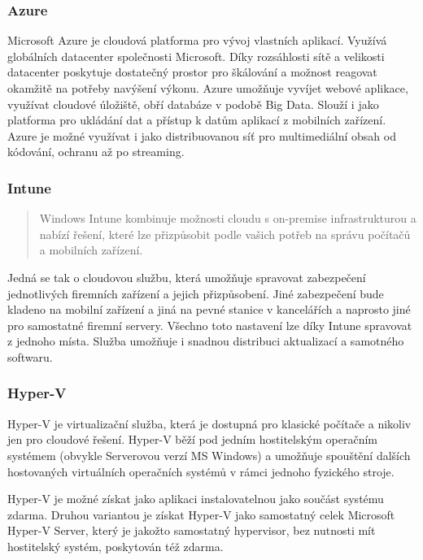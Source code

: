 \subsubsection{Azure}
Microsoft Azure je cloudová platforma pro vývoj vlastních aplikací. Využívá globálních datacenter společnosti Microsoft. Díky rozsáhlosti sítě a velikosti datacenter poskytuje dostatečný prostor pro škálování a možnost reagovat okamžitě na potřeby navýšení výkonu. Azure umožňuje vyvíjet webové aplikace, využívat cloudové úložiště, obří databáze v podobě Big Data. Slouží i jako platforma pro ukládání dat a přístup k datům aplikací z mobilních zařízení. Azure je možné využívat i jako distribuovanou síť pro multimediální obsah od kódování, ochranu až po streaming. \nocite{ms:azure}

\subsubsection{Intune}
\begin{quote}
Windows Intune kombinuje možnosti cloudu s on-premise infrastrukturou a nabízí řešení, které lze přizpůsobit podle vašich potřeb na správu počítačů a mobilních zařízení.\cite{ms:intune}
\end{quote}

Jedná se tak o cloudovou službu, která umožňuje spravovat zabezpečení jednotlivých firemních zařízení a jejich přizpůsobení. Jiné zabezpečení bude kladeno na mobilní zařízení a jiná na pevné stanice v kancelářích a naprosto jiné pro samostatné firemní servery. Všechno toto nastavení lze díky Intune spravovat z jednoho místa. Služba umožňuje i snadnou distribuci aktualizací a samotného softwaru.

\subsubsection{Hyper-V}
Hyper-V je virtualizační služba, která je dostupná pro klasické počítače a nikoliv jen pro cloudové řešení. Hyper-V běží pod jedním hostitelským operačním systémem (obvykle Serverovou verzí MS Windows) a umožňuje spouštění dalších hostovaných virtuálních operačních systémů v rámci jednoho fyzického stroje.

Hyper-V je možné získat jako aplikaci instalovatelnou jako součást systému zdarma. Druhou variantou je získat Hyper-V jako samostatný celek Microsoft Hyper-V Server, který je jakožto samostatný hypervisor, bez nutnosti mít hostitelský systém, poskytován též zdarma.

